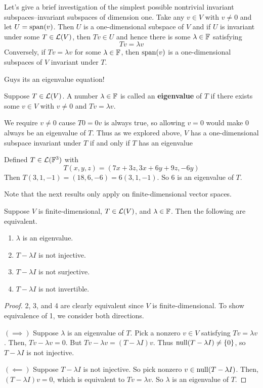 Let's give a brief investigation of the simplest possible nontrivial invariant subspaces--invariant subspaces of dimension one. Take any $v\in V$ with $v \ne 0$ and let $U = \operatorname{span}(v)$. Then $U$ is a one-dimensional subspace of $V$ and if $U$ is invariant under some $T\in\mathcal{L}(V)$, then $Tv \in U$ and hence there is some $\lambda\in\mathbb F$ satisfying
\[ Tv = \lambda v\]
Conversely, if $Tv = \lambda v$ for some $\lambda\in\mathbb F$, then $\operatorname{span}(v)$ is a one-dimensional subspaces of $V$ invariant under $T$. 

Guys its an eigenvalue equation!
\begin{definition}[Eigenvalue]
    Suppose $T\in\mathcal{L}(V)$. A number $\lambda\in\mathbb F$ is called an \textbf{eigenvalue} of $T$ if there exists some $v\in V$ with $v\ne 0$ and $Tv = \lambda v$.
\end{definition}
We require $v\ne 0$ cause $T0 = 0v$ is always true, so allowing $v=0$ would make $0$ always be an eigenvalue of $T$. Thus as we explored above, $V$ has a one-dimensional subspace invariant under $T$ if and only if $T$ has an eigenvalue
\begin{example}[Eigenvalue]
    Defined $T\in\mathcal{L}(\mathbb F^3)$ with
    \[ T(x,y,z) = (7x + 3z, 3x+6y + 9z, -6y ) \]
     Then $T(3, 1, -1) = (18, 6, -6) = 6(3, 1, -1)$. So $6$ is an eigenvalue of $T$.
\end{example}
Note that the next results only apply on finite-dimensional vector spaces.
\begin{theorem}
    Suppose $V$ is finite-dimensional, $T\in\mathcal{L}(V)$, and $\lambda\in\mathbb F$. Then the following are equivalent.
    \begin{enumerate}
        \item $\lambda$ is an eigenvalue.
        \item $T - \lambda I$ is not injective.
        \item $T - \lambda I$ is not surjective.
        \item $T - \lambda I$ is not invertible.
    \end{enumerate}
\end{theorem}
\begin{proof}
    2, 3, and 4 are clearly equivalent since $V$ is finite-dimensional. To show equivalence of 1, we consider both directions.
    
    $(\implies)$ Suppose $\lambda$ is an eigenvalue of $T$. Pick a nonzero $v\in V$ satisfying $Tv = \lambda v$. Then, $Tv - \lambda v = 0$. But $Tv - \lambda v = (T - \lambda I)v$. Thus $\operatorname{null}(T-\lambda I) \ne \{0\}$, so $T - \lambda I$ is not injective.

    $(\impliedby)$ Suppose $T - \lambda I$ is not injective. So pick nonzero $v\in \operatorname{null}(T-\lambda I)$. Then, $(T-\lambda I)v = 0$, which is equivalent to $Tv = \lambda v$. So $\lambda$ is an eigenvalue of $T$.
\end{proof}
